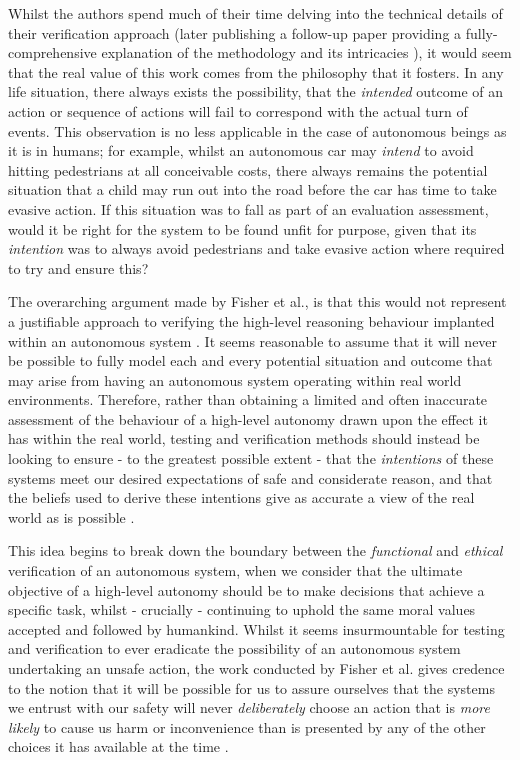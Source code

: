 \documentclass[conference]{IEEEtran}
\begin{document}
Whilst the authors spend much of their time delving into the technical details of their verification approach (later publishing a follow-up paper providing a fully-comprehensive explanation of the methodology and its intricacies \cite{fisher-1}), it would seem that the real value of this work comes from the philosophy that it fosters. In any life situation, there always exists the possibility, that the \textit{intended} outcome of an action or sequence of actions will fail to correspond with the actual turn of events. This observation is no less applicable in the case of autonomous beings as it is in humans; for example, whilst an autonomous car may \textit{intend} to avoid hitting pedestrians at all conceivable costs, there always remains the potential situation that a child may run out into the road before the car has time to take evasive action. If this situation was to fall as part of an evaluation assessment, would it be right for the system to be found unfit for purpose, given that its \textit{intention} was to always avoid pedestrians and take evasive action where required to try and ensure this? 

The overarching argument made by Fisher et al., is that this would not represent a justifiable approach to verifying the high-level reasoning behaviour implanted within an autonomous system \cite{fisher-1}. It seems reasonable to assume that it will never be possible to fully model each and every potential situation and outcome that may arise from having an autonomous system operating within real world environments. Therefore, rather than obtaining a limited and often inaccurate assessment of the behaviour of a high-level autonomy drawn upon the effect it has within the real world, testing and verification methods should instead be looking to ensure - to the greatest possible extent - that the \textit{intentions} of these systems meet our desired expectations of safe and considerate reason, and that the beliefs used to derive these intentions give as accurate a view of the real world as is possible \cite{fisher-1}. 

This idea begins to break down the boundary between the \textit{functional} and \textit{ethical} verification of an autonomous system, when we consider that the ultimate objective of a high-level autonomy should be to make decisions that achieve a specific task, whilst - crucially - continuing to uphold the same moral values accepted and followed by humankind. Whilst it seems insurmountable for testing and verification to ever eradicate the possibility of an autonomous system undertaking an unsafe action, the work conducted by Fisher et al. gives credence to the notion that it will be possible for us to assure ourselves that the systems we entrust with our safety will never \textit{deliberately} choose an action that is \textit{more likely} to cause us harm or inconvenience than is presented by any of the other choices it has available at the time \cite{fisher-1}. 
\end{document}
